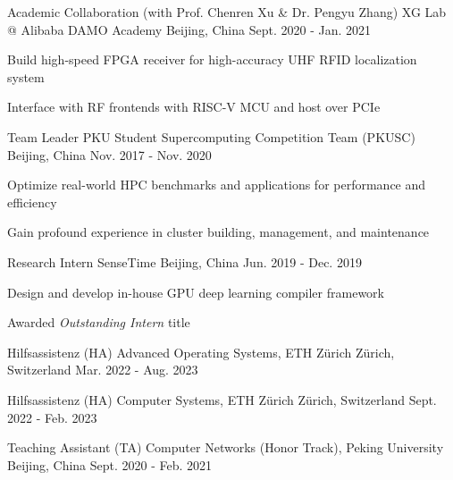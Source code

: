 \begin{cventries}
  \cventry
    {Academic Collaboration (with Prof. Chenren Xu \& Dr. Pengyu Zhang)} %
    {XG Lab @ Alibaba DAMO Academy} %
    {Beijing, China} %
    {Sept. 2020 - Jan. 2021} %
    {
      \begin{cvitems} %
        \item {Build high-speed FPGA receiver for high-accuracy UHF RFID localization system}
        \item {Interface with RF frontends with RISC-V MCU and host over PCIe}
      \end{cvitems}
    }

  \cventry
    {Team Leader} %
    {PKU Student Supercomputing Competition Team (PKUSC)} %
    {Beijing, China} %
    {Nov. 2017 - Nov. 2020} %
    {
      \begin{cvitems} %
        \item {Optimize real-world HPC benchmarks and applications for performance and efficiency}
        \item {Gain profound experience in cluster building, management, and maintenance}
      \end{cvitems}
    }

\end{cventries}


\begin{cventries}
    \cventry
    {Research Intern}
    {SenseTime}
    {Beijing, China}
    {Jun. 2019 - Dec. 2019}
    {
        \begin{cvitems}
        \item {Design and develop in-house GPU deep learning compiler framework}
        \item {Awarded \textit{Outstanding Intern} title}
        \end{cvitems}
    }
\end{cventries}


\begin{cventries}
    \cventry
    {Hilfsassistenz (HA)}
    {Advanced Operating Systems, ETH Z\"urich}
    {Z\"urich, Switzerland}
    {Mar. 2022 - Aug. 2023}
    {}

    \cventry
    {Hilfsassistenz (HA)}
    {Computer Systems, ETH Z\"urich}
    {Z\"urich, Switzerland}
    {Sept. 2022 - Feb. 2023}
    {}

    \cventry
    {Teaching Assistant (TA)}
    {Computer Networks (Honor Track), Peking University}
    {Beijing, China}
    {Sept. 2020 - Feb. 2021}
    {}
\end{cventries}
